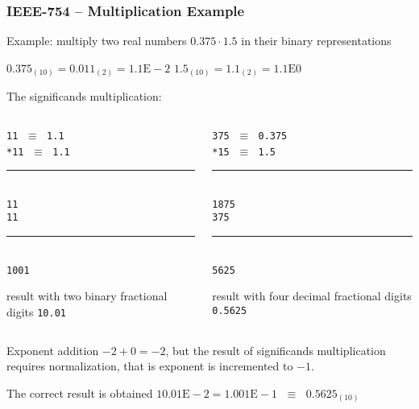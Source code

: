 \documentclass{beamer}
\begin{document}
\begin{frame}
\frametitle{IEEE-754 -- Multiplication Example}

Example: multiply two real numbers $0.375 \cdot 1.5$ in their binary representations

$0.375_{(10)} = 0.011_{(2)} = 1.1\text{E}-2$ \phantom{xxx} $1.5_{(10)} = 1.1_{(2)} = 1.1\text{E}0$

The significands multiplication:\\
\begin{columns}
\begin{column}{0.45\textwidth}
\texttt{\phantom{xxx}11} $\;\equiv\;$ \texttt{1.1}\\
\texttt{\phantom{xx}*11} $\;\equiv\;$ \texttt{1.1}\vspace{-6pt}\\
\rule[0pt]{2cm}{0.4pt}\\
\texttt{\phantom{xxx}11}\\
\texttt{\phantom{xx}11}\vspace{-6pt}\\
\rule[0pt]{2cm}{0.4pt}\\
\texttt{\phantom{x}1001} 

result with two binary fractional digits \texttt{10.01}
\end{column}
\hfill
\begin{column}{0.45\textwidth}
\texttt{\phantom{xx}375} $\;\equiv\;$ \texttt{0.375}\\
\texttt{\phantom{xx}*15} $\;\equiv\;$ \texttt{1.5}\vspace{-6pt}\\
\rule[0pt]{2cm}{0.4pt}\\
\texttt{\phantom{x}1875}\\
\texttt{\phantom{x}375}\vspace{-6pt}\\
\rule[0pt]{2cm}{0.4pt}\\
\texttt{\phantom{x}5625} 

result with four decimal fractional digits \texttt{0.5625}
\end{column}
\end{columns}
\bigskip

Exponent addition $-2+0=-2$, but the result of significands multiplication requires normalization, that is exponent is incremented to $-1$.

The correct result is obtained $10.01\text{E}-2 = 1.001\text{E}-1$ $\;\equiv\;$ $0.5625_{(10)}$

\end{frame}
\end{document}
